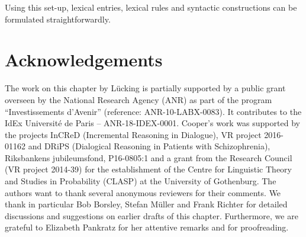 \documentclass[output=paper
	        ,collection
	        ,collectionchapter
 	        ,biblatex
                ,babelshorthands
                ,newtxmath
                ,draftmode
                ,colorlinks, citecolor=brown
]{langscibook}
\begin{document}
Using this set-up, lexical entries, lexical rules and syntactic constructions can be formulated straightforwardly. 


 
\section*{Acknowledgements}


The work on this chapter by Lücking is partially supported by a public grant overseen by the  National Research Agency (ANR) as part of the program ``Investissements d'Avenir'' (reference: ANR-10-LABX-0083). It contributes to the IdEx Université de Paris -- ANR-18-IDEX-0001. Cooper's work was supported by the projects InCReD (Incremental Reasoning in Dialogue), VR project 2016-01162 and DRiPS (Dialogical Reasoning in Patients with Schizophrenia), Riksbankens jubileumsfond, P16-0805:1 and a grant from the  Research Council (VR project 2014-39) for the establishment of the Centre for Linguistic Theory and Studies in Probability (CLASP) at the University of Gothenburg. The authors want to thank several anonymous reviewers for their comments. We thank in particular Bob Borsley, Stefan Müller and Frank Richter for detailed discussions and suggestions on earlier drafts of this chapter. Furthermore, we are grateful to Elizabeth Pankratz for her attentive remarks and for proofreading.


{\sloppy
\printbibliography[heading=subbibliography,notkeyword=this]
}
\end{document}
